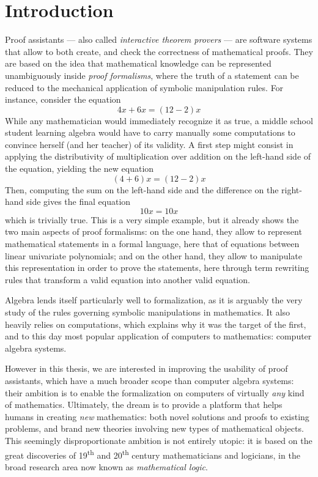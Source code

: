 \chapter{Introduction}


Proof assistants --- also called \emph{interactive theorem provers} --- are
software systems that allow to both create, and check the correctness of
mathematical proofs. They are based on the idea that mathematical knowledge can
be represented unambiguously inside \emph{proof formalisms}, where the truth of
a statement can be reduced to the mechanical application of symbolic
manipulation rules. For instance, consider the equation
$$4x + 6x = (12 - 2)x$$ 
While any mathematician would immediately recognize it as true, a middle school
student learning algebra would have to carry manually some computations to
convince herself (and her teacher) of its validity. A first step might consist
in applying the distributivity of multiplication over addition on the left-hand
side of the equation, yielding the new equation
$$(4 + 6)x = (12 - 2)x$$
Then, computing the sum on the left-hand side and the difference on the
right-hand side gives the final equation
$$10x = 10x$$
which is trivially true. This is a very simple example, but it already shows the
two main aspects of proof formalisms: on the one hand, they allow to represent
mathematical statements in a formal language, here that of equations between
linear univariate polynomials; and on the other hand, they allow to manipulate
this representation in order to prove the statements, here through term
rewriting rules that transform a valid equation into another valid equation.

Algebra lends itself particularly well to formalization, as it is arguably the
very study of the rules governing symbolic manipulations in mathematics. It also
heavily relies on computations, which explains why it was the target of the
first, and to this day most popular application of computers to mathematics:
computer algebra systems.

However in this thesis, we are interested in improving the usability of proof
assistants, which have a much broader scope than computer algebra systems: their
ambition is to enable the formalization on computers of virtually \emph{any}
kind of mathematics. Ultimately, the dream is to provide a platform that helps
humans in creating \emph{new} mathematics: both novel solutions and proofs to
existing problems, and brand new theories involving new types of mathematical
objects. This seemingly disproportionate ambition is not entirely utopic: it is
based on the great discoveries of 19\textsuperscript{th} and
20\textsuperscript{th} century mathematicians and logicians, in the broad
research area now known as \emph{mathematical logic}.

